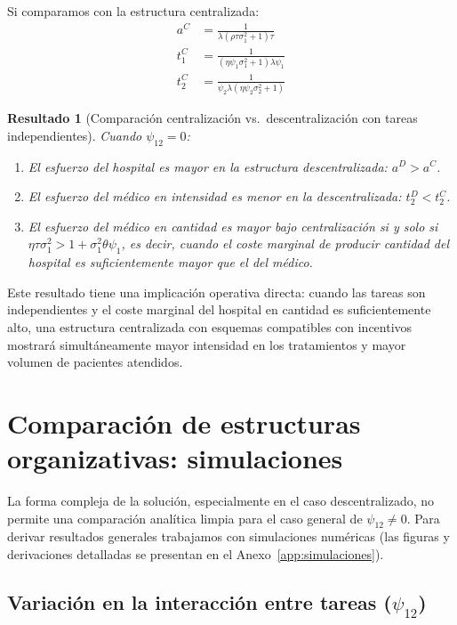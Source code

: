 \documentclass[12pt, a4paper, twoside, openright]{book}
\theoremstyle{plain}
\newtheorem{result}{Resultado}[chapter]
\theoremstyle{definition}
\theoremstyle{remark}
\begin{document}
Si comparamos con la estructura centralizada:
\begin{align}
  a^C &= \frac{1}{\lambda(\rho\tau\sigma_1^2+1)\tau} \label{eq:aC_indep}\\
  t_1^C &= \frac{1}{(\eta\psi_1\sigma_1^2+1)\lambda\psi_1} \label{eq:t1C_indep}\\
  t_2^C &= \frac{1}{\psi_2\lambda(\eta\psi_2\sigma_2^2+1)} \label{eq:t2C_indep}
\end{align}

\begin{result}[Comparación centralización vs.\ descentralización con tareas independientes]
\label{res:comparacion_independientes}
Cuando $\psi_{12}=0$:
\begin{enumerate}[label=(\alph*)]
  \item El esfuerzo del hospital es mayor en la estructura descentralizada: $a^D>a^C$.
  \item El esfuerzo del médico en intensidad es menor en la descentralizada: $t_2^D<t_2^C$.
  \item El esfuerzo del médico en cantidad es mayor bajo centralización si y solo si $\eta\tau\sigma_1^2 > 1+\sigma_1^2\theta\psi_1$, es decir, cuando el coste marginal de producir cantidad del hospital es suficientemente mayor que el del médico.
\end{enumerate}
\end{result}

Este resultado tiene una implicación operativa directa: cuando las tareas son independientes y el coste marginal del hospital en cantidad es suficientemente alto, una estructura centralizada con esquemas compatibles con incentivos mostrará simultáneamente mayor intensidad en los tratamientos y mayor volumen de pacientes atendidos.


\section{Comparación de estructuras organizativas: simulaciones}
\label{sec:simulaciones_resumen}

La forma compleja de la solución, especialmente en el caso descentralizado, no permite una comparación analítica limpia para el caso general de $\psi_{12}\neq 0$. Para derivar resultados generales trabajamos con simulaciones numéricas (las figuras y derivaciones detalladas se presentan en el Anexo~\ref{app:simulaciones}).

\subsection{Variación en la interacción entre tareas (\texorpdfstring{$\psi_{12}$}{psi\_12})}
\end{document}
